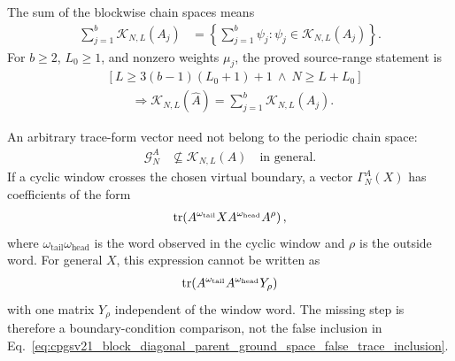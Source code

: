 \documentclass{article}
\begin{document}
The sum of the blockwise chain spaces means
\begin{align}
  \sum_{j=1}^b\mathcal K_{N,L}(A_j)
    &=
    \left\{\sum_{j=1}^b\psi_j:
      \psi_j\in\mathcal K_{N,L}(A_j)\right\}.
  \label{eq:cpgsv21_block_diagonal_parent_ground_space_space_sum}
\end{align}
For $b\geq2$, $L_0\geq1$, and nonzero weights $\mu_j$, the proved
source-range statement is
\begin{align}
  &\left[
    L\geq3(b-1)(L_0+1)+1
    \ \wedge\
    N\geq L+L_0\right]
  \nonumber\\
  &\qquad\Longrightarrow
  \mathcal K_{N,L}(\widehat A)
  =
  \sum_{j=1}^b\mathcal K_{N,L}(A_j).
  \label{eq:cpgsv21_block_diagonal_parent_ground_space_source_range_decomposition}
\end{align}

An arbitrary trace-form vector need not belong to the periodic chain space:
\begin{align}
  \mathcal G_N^A
    &\nsubseteq
    \mathcal K_{N,L}(A)
    \quad\text{in general}.
  \label{eq:cpgsv21_block_diagonal_parent_ground_space_false_trace_inclusion}
\end{align}
If a cyclic window crosses the chosen virtual boundary, a vector
$\Gamma_N^A(X)$ has coefficients of the form
\begin{align}
  \operatorname{tr}\!\left(A^{\omega_{\mathrm{tail}}}
    XA^{\omega_{\mathrm{head}}}A^\rho\right),
  \label{eq:cpgsv21_block_diagonal_parent_ground_space_crossing_trace}
\end{align}
where $\omega_{\mathrm{tail}}\omega_{\mathrm{head}}$ is the word observed in
the cyclic window and $\rho$ is the outside word. For general $X$, this
expression cannot be written as
\begin{align}
  \operatorname{tr}\!\left(A^{\omega_{\mathrm{tail}}}
    A^{\omega_{\mathrm{head}}}Y_\rho\right)
  \label{eq:cpgsv21_block_diagonal_parent_ground_space_local_trace}
\end{align}
with one matrix $Y_\rho$ independent of the window word. The missing step is
therefore a boundary-condition comparison, not the false inclusion in
Eq.~\ref{eq:cpgsv21_block_diagonal_parent_ground_space_false_trace_inclusion}.
\end{document}
